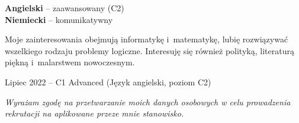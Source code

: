 \documentclass[8pt]{developercv} %
\begin{document}
\begin{minipage}[t]{0.3\textwidth}
  \vspace{-\baselineskip}


  \textbf{Angielski} -- zaawansowany (C2)\\
  \textbf{Niemiecki} -- komunikatywny
\end{minipage}
\hfill
\begin{minipage}[t]{0.3\textwidth}
  \vspace{-\baselineskip}


  Moje zainteresowania obejmują informatykę i~matematykę,
  lubię rozwiązywać wszelkiego rodzaju problemy logiczne.
  Interesuję się również polityką, literaturą piękną i~malarstwem nowoczesnym.
\end{minipage}
\hfill
\begin{minipage}[t]{0.35\textwidth}
  \vspace{-\baselineskip}

  Lipiec 2022 -- C1 Advanced (Język angielski, poziom C2)
\end{minipage}


\vspace{22pt}

\centering\begin{minipage}{0.6\linewidth}
  \centering\textit{
  Wyrażam zgodę na przetwarzanie moich danych osobowych w celu prowadzenia rekrutacji na aplikowane przeze mnie stanowisko.
}
\end{minipage}
\end{document}
